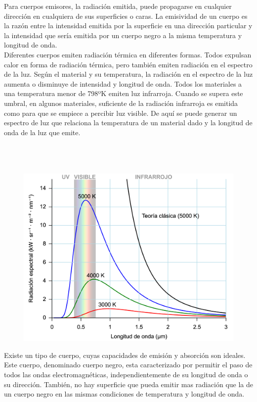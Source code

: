 \documentclass[a4paper,12pt]{report}
\begin{document}
  Para cuerpos emisores, la radiación emitida, puede propagarse en cualquier dirección en cualquiera
  de sus superficies o caras. La emisividad de un cuerpo es la razón entre la intensidad emitida por la
  superficie en una dirección particular y la intensidad que sería emitida por un cuerpo negro a la misma temperatura y
  longitud de onda.\\

  Diferentes cuerpos emiten radiación térmica en diferentes formas. Todos expulsan calor en forma de radiación térmica,
  pero también emiten radiación en el espectro de la luz. Según el material y su temperatura, la radiación en el
  espectro de la luz aumenta o disminuye de intensidad y longitud de onda. Todos los materiales a una
  temperatura menor de 798ºK emiten luz infrarroja. Cuando se supera este umbral, en algunos materiales, suficiente de
  la radiación infrarroja es emitida como para que se empiece a percibir luz visible. De aquí se puede generar un
  espectro de luz que relaciona la temperatura de un material dado y la longitud de onda de la luz que emite.\\\\\\\\
  \begin{figure}[h!]
    \centering
    \includegraphics[width=\linewidth]{images/img1.png}
  \end{figure}

  Existe un tipo de cuerpo, cuyas capacidades de emisión y absorción son ideales. Este cuerpo, denominado cuerpo negro,
  esta caracterizado por permitir el paso de todos las ondas electromagnéticas, independientemente de su longitud de
  onda o su dirección. También, no hay superficie que pueda emitir mas radiación que la de un cuerpo negro en las
  mismas condiciones de temperatura y longitud de onda.\\
\end{document}
